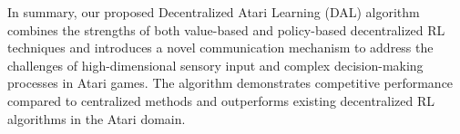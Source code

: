 In summary, our proposed Decentralized Atari Learning (DAL) algorithm combines the strengths of both value-based and policy-based decentralized RL techniques and introduces a novel communication mechanism to address the challenges of high-dimensional sensory input and complex decision-making processes in Atari games. The algorithm demonstrates competitive performance compared to centralized methods and outperforms existing decentralized RL algorithms in the Atari domain.